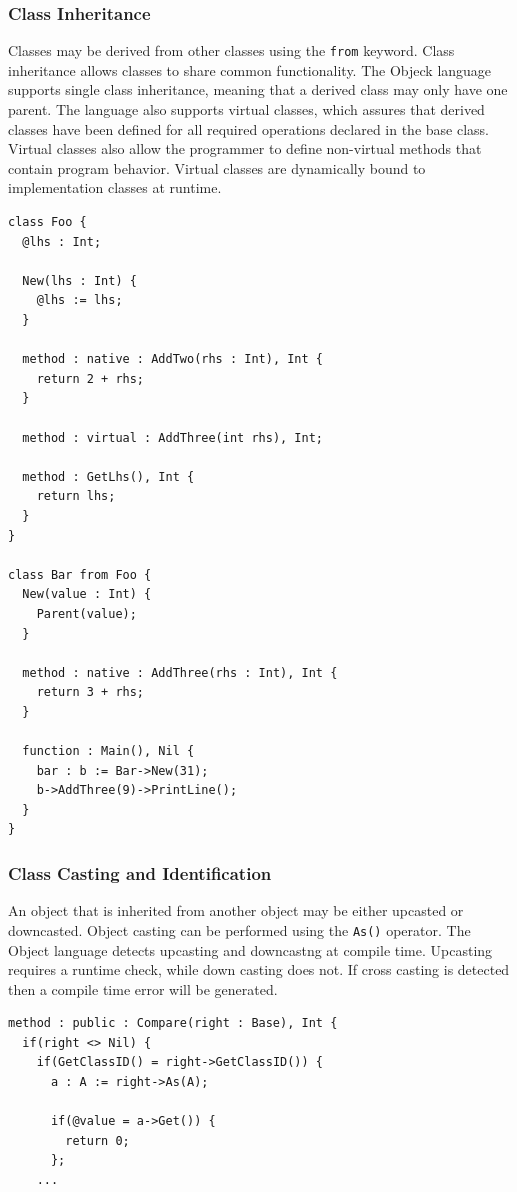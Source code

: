 \documentclass[12pt]{article}
\begin{document}
\subsubsection{Class Inheritance}
Classes may be derived from other classes using the \texttt{from} keyword.  Class inheritance allows classes to share common functionality.  The Objeck language supports single class inheritance, meaning that a derived class may only have one parent.  The language also supports virtual classes, which assures that derived classes have been defined for all required operations declared in the base class.  Virtual classes also allow the programmer to define non-virtual methods that contain program behavior.  Virtual classes are dynamically bound to implementation classes at runtime.
\begin{verbatim}
class Foo {
  @lhs : Int;

  New(lhs : Int) {
    @lhs := lhs;
  }

  method : native : AddTwo(rhs : Int), Int {
    return 2 + rhs;
  }

  method : virtual : AddThree(int rhs), Int;

  method : GetLhs(), Int {
    return lhs;
  }
}

class Bar from Foo {
  New(value : Int) {
    Parent(value);
  }

  method : native : AddThree(rhs : Int), Int {
    return 3 + rhs;
  }

  function : Main(), Nil {
    bar : b := Bar->New(31);
    b->AddThree(9)->PrintLine();
  }
}
\end{verbatim}

\subsubsection{Class Casting and Identification}
An object that is inherited from another object may be either upcasted or downcasted.  Object casting can be performed using the \texttt{As()} operator.  The Object language detects upcasting and downcastng at compile time. Upcasting requires a runtime check, while down casting does not. If cross casting is detected then a compile time error will be generated.

\begin{verbatim}
method : public : Compare(right : Base), Int {
  if(right <> Nil) {
    if(GetClassID() = right->GetClassID()) {
      a : A := right->As(A);

      if(@value = a->Get()) {
        return 0;
      };
    ...	
\end{verbatim}
\end{document}
